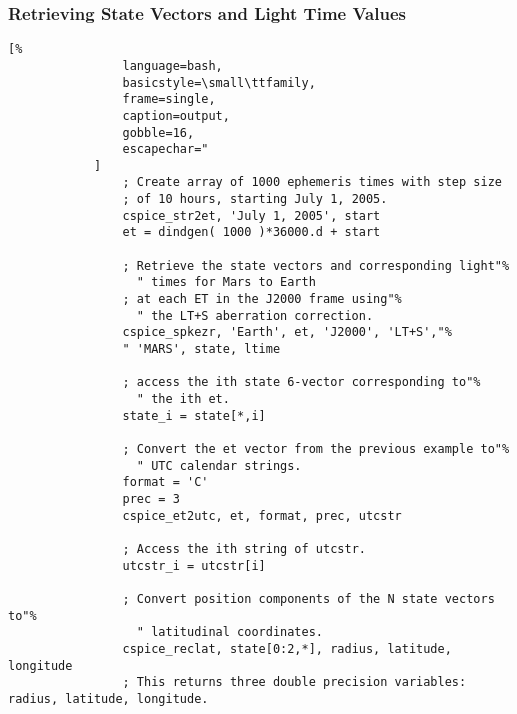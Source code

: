 \documentclass[crop=false,class=book]{standalone}
\begin{document}
        \subsubsection{Retrieving State Vectors and Light Time Values}
            \begin{lstlisting}[%
                language=bash,
                basicstyle=\small\ttfamily,
                frame=single,
                caption=output,
                gobble=16,
                escapechar="
            ]
                ; Create array of 1000 ephemeris times with step size
                ; of 10 hours, starting July 1, 2005.
                cspice_str2et, 'July 1, 2005', start
                et = dindgen( 1000 )*36000.d + start

                ; Retrieve the state vectors and corresponding light"%
                  " times for Mars to Earth
                ; at each ET in the J2000 frame using"%
                  " the LT+S aberration correction.
                cspice_spkezr, 'Earth', et, 'J2000', 'LT+S',"%
                " 'MARS', state, ltime
    
                ; access the ith state 6-vector corresponding to"%
                  " the ith et.
                state_i = state[*,i]

                ; Convert the et vector from the previous example to"%
                  " UTC calendar strings.
                format = 'C'
                prec = 3
                cspice_et2utc, et, format, prec, utcstr

                ; Access the ith string of utcstr.
                utcstr_i = utcstr[i]

                ; Convert position components of the N state vectors to"%
                  " latitudinal coordinates.
                cspice_reclat, state[0:2,*], radius, latitude, longitude
                ; This returns three double precision variables: radius, latitude, longitude.
            \end{lstlisting}
\end{document}
